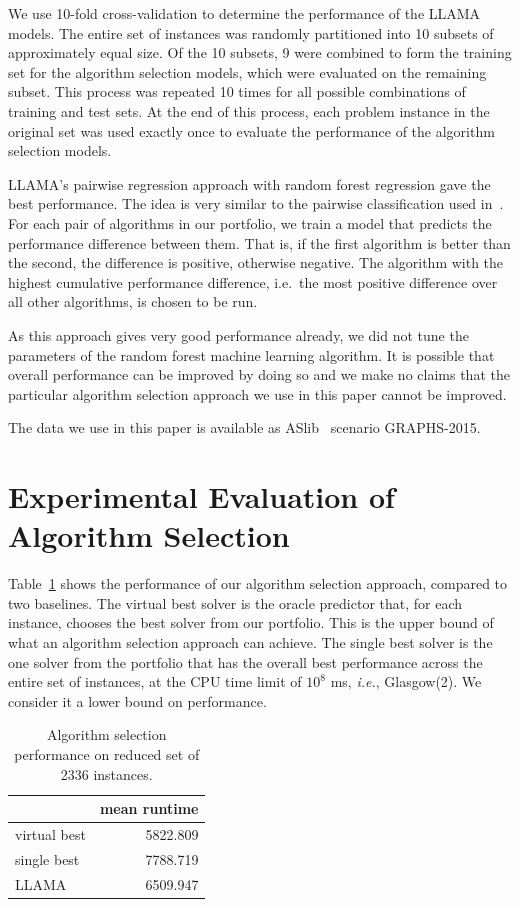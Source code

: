 \documentclass{llncs}
\begin{document}
We use 10-fold cross-validation to determine the performance of the LLAMA
models. The entire set of instances was randomly partitioned into 10 subsets of
approximately equal size. Of the 10 subsets, 9 were combined to form the
training set for the algorithm selection models, which were evaluated on the
remaining subset. This process was repeated 10 times for all possible
combinations of training and test sets. At the end of this process, each problem
instance in the original set was used exactly once to evaluate the performance
of the algorithm selection models.

LLAMA's pairwise regression approach with random forest regression gave the best
performance. The idea is very similar to the pairwise classification used
in~\cite{xu_satzilla_2008}. For each pair of algorithms in our portfolio, we
train a model that predicts the performance difference between them. That is, if
the first algorithm is better than the second, the difference is positive,
otherwise negative. The algorithm with the highest cumulative performance
difference, i.e.\ the most positive difference over all other algorithms, is
chosen to be run.

As this approach gives very good performance already, we did not tune the
parameters of the random forest machine learning algorithm. It is possible that
overall performance can be improved by doing so and we make no claims that the
particular algorithm selection approach we use in this paper cannot be improved.

The data we use in this paper is available as ASlib~\cite{aslib} scenario
GRAPHS-2015.


\section{Experimental Evaluation of Algorithm Selection}

Table~\ref{tab:res} shows the performance of our algorithm selection approach, compared to two
baselines. The virtual best solver is the oracle predictor that, for each instance, chooses the best
solver from our portfolio. This is the upper bound of what an algorithm selection approach can
achieve. The single best solver is the one solver from the portfolio that has the overall best
performance across the entire set of instances, at the CPU time limit of $10^8$ ms, {\em i.e.}, Glasgow(2). We consider it a lower bound on performance.

\begin{table}[ht]
\centering
\begin{tabular}{lr}
  \toprule
& mean runtime\\
  \midrule
virtual best & 5822.809\\
  single best & 7788.719\\
  LLAMA & 6509.947\\
   \bottomrule
\end{tabular}
\vspace{1ex}
\caption{Algorithm selection performance on reduced set of 2336
instances.}\label{tab:res}
\end{table}
\end{document}
